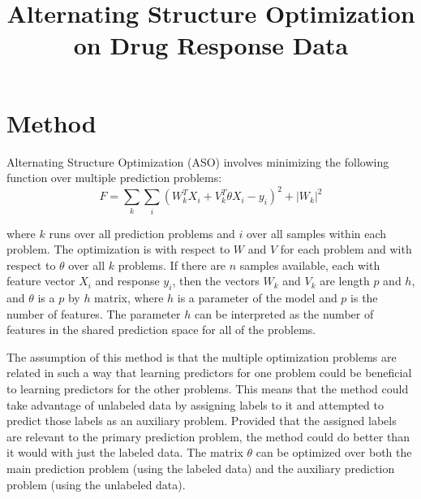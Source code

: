 \documentclass{article}
\begin{document}
\title{Alternating Structure Optimization on Drug Response Data}
\maketitle
\section{Method}
Alternating Structure Optimization (ASO) involves minimizing the following function over multiple prediction problems:
\begin{equation}
F = \sum\limits_{k} \sum\limits_{i}
(W_k^TX_i + V_k^T\theta X_i - y_i)^2 + |W_k|^2 
\end{equation}



where $k$ runs over all prediction problems and $i$ over all samples within each problem. The optimization is with respect to $W$ and $V$ for each problem and with respect to $\theta$ over all $k$ problems. If there are $n$ samples available, each with feature vector $X_i$ and response $y_i$, then the vectors $W_k$ and $V_k$ are length $p$ and $h$, and $\theta$ is a $p$ by $h$ matrix, where $h$ is a parameter of the model and $p$ is the number of features. The parameter $h$ can be interpreted as the number of features in the shared prediction space for all of the problems. 
 
The assumption of this method is that the multiple optimization problems are related in such a way that learning predictors for one problem could be beneficial to learning predictors for the other problems. This means that the method could take advantage of unlabeled data by assigning labels to it and attempted to predict those labels as an auxiliary problem. Provided that the assigned labels are relevant to the primary prediction problem, the method could do better than it would with just the labeled data. The matrix $\theta$ can be optimized over both the main prediction problem (using the labeled data) and the auxiliary prediction problem (using the unlabeled data). 
\end{document}
